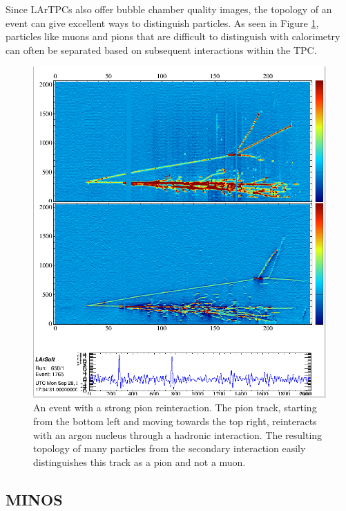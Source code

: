 Since LArTPCs also offer bubble chamber quality images, the topology of an event can give excellent ways to distinguish particles.  As seen in Figure \ref{fig:mu_pi}, particles like muons and pions that are difficult to distinguish with calorimetry can often be separated based on subsequent interactions within the TPC.

\begin{figure}[tb]
  \centering
  \includegraphics[width=\textwidth]{lartpc_figures/r650_1765_pi_zero_overlaid_with_track.png}
  \caption[Pion Reinteraction]{An \argoneut event with a strong pion reinteraction.  The pion track, starting from the bottom left and moving towards the top right, reinteracts with an argon nucleus through a hadronic interaction.  The resulting topology of many particles from the secondary interaction easily distinguishes this track as a pion and not a muon.}
  \label{fig:mu_pi}
\end{figure}



\subsection{MINOS}

